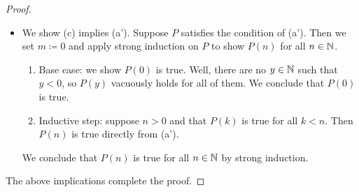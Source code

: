 \documentclass[../notes.tex]{subfiles}
\begin{document}
\begin{proof}
\begin{itemize}
        \item We show (c) implies (a'). Suppose $P$ satisfies the condition of (a'). Then we set $m\coloneqq0$ and apply strong induction on $P$ to show $P(n)$ for all $n\in\mathbb N$.
        \begin{enumerate}
            \item Base case: we show $P(0)$ is true. Well, there are no $y\in\mathbb N$ such that $y<0$, so $P(y)$ vacuously holds for all of them. We conclude that $P(0)$ is true.
            \item Inductive step: suppose $n>0$ and that $P(k)$ is true for all $k<n$. Then $P(n)$ is true directly from (a').
        \end{enumerate}
        We conclude that $P(n)$ is true for all $n\in\mathbb N$ by strong induction.
    \end{itemize}
    The above implications complete the proof.
\end{proof}
\end{document}
